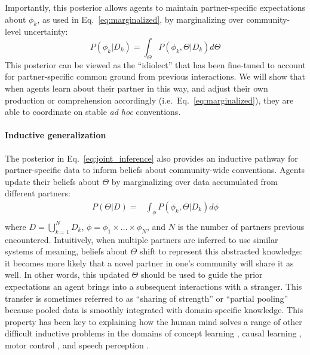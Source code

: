 Importantly, this posterior allows agents to maintain partner-specific expectations about $\phi_k$, as used in Eq.~\ref{eq:marginalized}, by marginalizing over community-level uncertainty:
\begin{equation}
P(\phi_k | D_k) =  \int_{\Theta}P(\phi_k, \Theta | D_k)  d\Theta
\end{equation}
This posterior can be viewed as the ``idiolect'' that has been fine-tuned to account for partner-specific common ground from previous interactions.
We will show that when agents learn about their partner in this way, and adjust their own production or comprehension accordingly (i.e.~Eq.~\ref{eq:marginalized}), they are able to coordinate on stable \emph{ad hoc} conventions.


\paragraph{Inductive generalization}

The posterior in Eq.~\ref{eq:joint_inference} also provides an inductive pathway for partner-specific data to inform beliefs about community-wide conventions.
Agents update their beliefs about $\Theta$ by marginalizing over data accumulated from different partners:
\begin{equation}
\begin{split}
    P(\Theta | D)  = & \int_{\phi} P(\phi_k, \Theta | D_k) d\phi \\
\end{split}
\end{equation}
where $D = \bigcup_{k=1}^N D_k$, $\phi = \phi_1 \times \dots \times \phi_N$, and $N$ is the number of partners previous encountered. 
Intuitively, when multiple partners are inferred to use similar systems of meaning, beliefs about $\Theta$ shift to represent this abstracted knowledge: it becomes more likely that a novel partner in one's community will share it as well.
In other words, this updated $\Theta$ should be used to guide the prior expectations an agent brings into a subsequent interactions with a stranger.
This transfer is sometimes referred to as ``sharing of strength'' or ``partial pooling'' because pooled data is smoothly integrated with domain-specific knowledge.
This property has been key to explaining how the human mind solves a range of other difficult inductive problems in the domains of concept learning \cite{KempPerforsTenenbaum07_HBM, tenenbaum_how_2011}, causal learning \cite{KempGoodmanTenenbaum10_LearningToLearn,GoodmanUllmanTenenbaum11_TheoryOfCausality},  motor control \cite{berniker2008estimating}, and speech perception \cite{kleinschmidt2015robust}.

